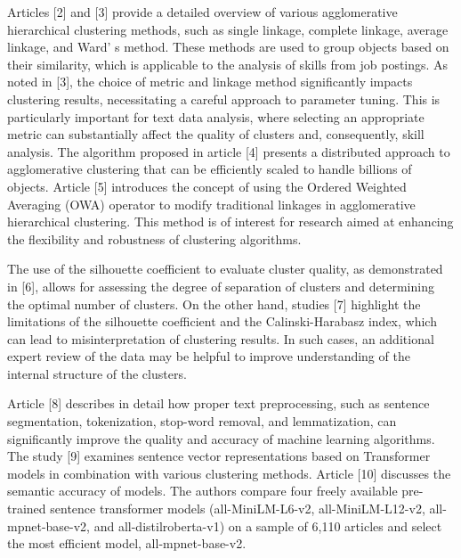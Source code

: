 \begin{multicols}{2}
Articles {[}2{]} and {[}3{]} provide a detailed overview of various
agglomerative hierarchical clustering methods, such as single linkage,
complete linkage, average linkage, and Ward' s method.
These methods are used to group objects based on their similarity, which
is applicable to the analysis of skills from job postings. As noted in
{[}3{]}, the choice of metric and linkage method significantly impacts
clustering results, necessitating a careful approach to parameter
tuning. This is particularly important for text data analysis, where
selecting an appropriate metric can substantially affect the quality of
clusters and, consequently, skill analysis. The algorithm proposed in
article {[}4{]} presents a distributed approach to agglomerative
clustering that can be efficiently scaled to handle billions of objects.
Article {[}5{]} introduces the concept of using the Ordered Weighted
Averaging (OWA) operator to modify traditional linkages in agglomerative
hierarchical clustering. This method is of interest for research aimed
at enhancing the flexibility and robustness of clustering algorithms.

The use of the silhouette coefficient to evaluate cluster quality, as
demonstrated in {[}6{]}, allows for assessing the degree of separation
of clusters and determining the optimal number of clusters. On the other
hand, studies {[}7{]} highlight the limitations of the silhouette
coefficient and the Calinski-Harabasz index, which can lead to
misinterpretation of clustering results. In such cases, an additional
expert review of the data may be helpful to improve understanding of the
internal structure of the clusters.

Article {[}8{]} describes in detail how proper text preprocessing, such
as sentence segmentation, tokenization, stop-word removal, and
lemmatization, can significantly improve the quality and accuracy of
machine learning algorithms. The study {[}9{]} examines sentence vector
representations based on Transformer models in combination with various
clustering methods. Article {[}10{]} discusses the semantic accuracy of
models. The authors compare four freely available pre-trained sentence
transformer models (all-MiniLM-L6-v2, all-MiniLM-L12-v2,
all-mpnet-base-v2, and all-distilroberta-v1) on a sample of 6,110
articles and select the most efficient model, all-mpnet-base-v2.


\end{multicols}
